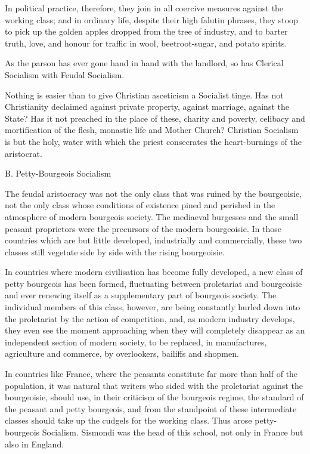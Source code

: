 \documentclass[11pt]{book}
\begin{document}
In political practice, therefore, they join in all coercive
measures against the working class; and in ordinary life,
despite their high falutin phrases, they stoop to pick up the
golden apples dropped from the tree of industry, and to barter
truth, love, and honour for traffic in wool, beetroot-sugar, and
potato spirits.

As the parson has ever gone hand in hand with the landlord,
so has Clerical Socialism with Feudal Socialism.

Nothing is easier than to give Christian asceticism a Socialist
tinge. Has not Christianity declaimed against private property,
against marriage, against the State? Has it not preached in the
place of these, charity and poverty, celibacy and mortification
of the flesh, monastic life and Mother Church? Christian
Socialism is but the holy, water with which the priest consecrates
the heart-burnings of the aristocrat.


B. Petty-Bourgeois Socialism

The feudal aristocracy was not the only class that was ruined by
the bourgeoisie, not the only class whose conditions of existence
pined and perished in the atmosphere of modern bourgeois society.
The mediaeval burgesses and the small peasant proprietors were
the precursors of the modern bourgeoisie.  In those countries
which are but little developed, industrially and commercially,
these two classes still vegetate side by side with the rising
bourgeoisie.

In countries where modern civilisation has become fully
developed, a new class of petty bourgeois has been formed,
fluctuating between proletariat and bourgeoisie and ever renewing
itself as a supplementary part of bourgeois society.  The
individual members of this class, however, are being constantly
hurled down into the proletariat by the action of competition,
and, as modern industry develops, they even see the moment
approaching when they will completely disappear as an independent
section of modern society, to be replaced, in manufactures,
agriculture and commerce, by overlookers, bailiffs and shopmen.

In countries like France, where the peasants constitute far more
than half of the population, it was natural that writers who
sided with the proletariat against the bourgeoisie, should use,
in their criticism of the bourgeois regime, the standard of the
peasant and petty bourgeois, and from the standpoint of these
intermediate classes should take up the cudgels for the working
class.  Thus arose petty-bourgeois Socialism.  Sismondi was the
head of this school, not only in France but also in England.
\end{document}
